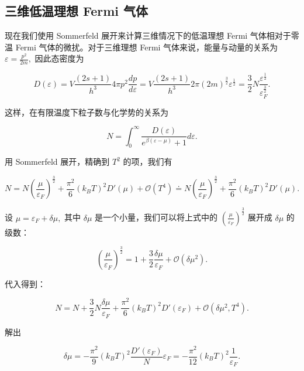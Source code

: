 \subsection{三维低温理想 Fermi 气体}
现在我们使用 Sommerfeld 展开来计算三维情况下的低温理想 Fermi 气体相对于零温 Fermi 气体的微扰。对于三维理想 Fermi 气体来说，能量与动量的关系为 $\varepsilon = \frac{p^2}{2m},$ 因此态密度为 
\begin{linenomath}\begin{equation}
D(\varepsilon) = V\frac{(2s+1)}{h^3} 4\pi p^2 \frac{dp}{d\varepsilon} = V\frac{(2s+1)}{h^3} 2\pi (2m)^{\frac32} \varepsilon^{\frac12}=\frac32N\frac{\varepsilon^{\frac12}}{\varepsilon_F^{\frac32}}.
\end{equation}\end{linenomath}
这样，在有限温度下粒子数与化学势的关系为
\begin{linenomath}\begin{equation}
    N = \int_{0}^{\infty} \frac{D(\varepsilon)}{e^{\beta(\varepsilon - \mu)} + 1} d\varepsilon.
\end{equation}\end{linenomath}
用 Sommerfeld 展开，精确到 $T^2$ 的项，我们有
\begin{linenomath}\begin{equation}
    N = N\left( \frac{\mu}{\varepsilon_F} \right)^{\frac32} + \frac{\pi^2}{6}(k_B T)^2 D'(\mu) + \mathcal{O}(T^4) \doteq N\left( \frac{\mu}{\varepsilon_F} \right)^{\frac32} + \frac{\pi^2}{6}(k_B T)^2 D'(\mu).
\end{equation}\end{linenomath}
设 $\mu = \varepsilon_F + \delta\mu,$ 其中 $\delta\mu$ 是一个小量，我们可以将上式中的 $\left( \frac{\mu}{\varepsilon_F} \right)^{\frac32}$ 展开成 $\delta\mu$ 的级数：
\begin{linenomath}\begin{equation}
    \left( \frac{\mu}{\varepsilon_F} \right)^{\frac32} = 1 + \frac{3}{2}\frac{\delta\mu}{\varepsilon_F} + \mathcal{O}(\delta\mu^2).
\end{equation}\end{linenomath}
代入得到：
\begin{linenomath}\begin{equation}
    N = N + \frac{3}{2}N\frac{\delta\mu}{\varepsilon_F} + \frac{\pi^2}{6}(k_B T)^2 D'(\varepsilon_F) + \mathcal{O}(\delta\mu^2, T^4).
\end{equation}\end{linenomath}
解出
\begin{linenomath}\begin{equation}
    \delta\mu = -\frac{\pi^2}{9}(k_B T)^2 \frac{D'(\varepsilon_F)}{N} \varepsilon_F = -\frac{\pi^2}{12}(k_B T)^2 \frac{1}{\varepsilon_F}.
\end{equation}\end{linenomath}
